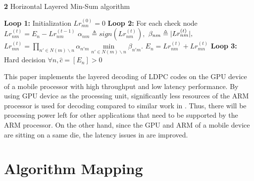 \documentclass[conference]{IEEEtran}
\DeclarePairedDelimiter\abs{\lvert}{\rvert}%
\begin{document}
\begin{algorithm}
\renewcommand\thealgorithm{}
\caption{\textbf{2} Horizontal Layered Min-Sum algorithm}\label{algorithm2}
\begin{algorithmic}[1]
\STATE \textbf{Loop 1:} Initialization
\STATE
$Lr_{mn}^{(0)}=0$%
\ENDFOR
{}
\STATE \textbf{Loop 2:} For each check node
\STATE$Lr_{nm}^{(t)}=E_n - Lr_{nm}^{(t-1)}$
\ENDFOR
{}
\STATE $\alpha_{nm} \triangleq sign(Lr_{nm}^{(t)}),$
\STATE $\beta_{nm} \triangleq \abs{Lr_{nm}^{(t)}},$
\STATE $Lr_{mn}^{(t)} = \prod\limits_{n' \in N(m)\backslash n} \alpha_{n'm} \min\limits_{n' \in N(m)\backslash n} \beta_{n'm}.$
\ENDFOR
{}
\STATE$E_n = Lr_{nm}^{(t)}+Lr_{mn}^{(t)}$
\ENDFOR
\ENDFOR
\STATE \textbf{Loop 3:} Hard decision
\STATE $\forall n, \hat{c}=[E_n]>0$
\ENDFOR
\ENDFOR %
\end{algorithmic}
\addtocounter{algorithm}{-1}
\end{algorithm}
This paper implements the layered decoding of LDPC codes on the GPU device of a mobile processor with high throughput and low latency performance. By using GPU device as the processing unit, significantly less resources of the ARM processor is used for decoding compared to similar work in \cite{art_neon}. Thus, there will be processing power left for other applications that need to be supported by the ARM processor. On the other hand, since the GPU and ARM of a mobile device are sitting on a same die, the latency issues in \cite{art_gpu_0} are improved.
\section{Algorithm Mapping}\label{sec3}
\end{document}
